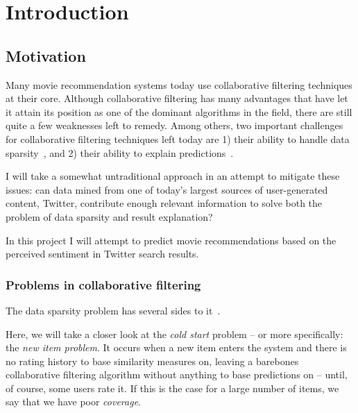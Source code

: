 
\chapter{Introduction} %

\label{Chapter1} %




\section{Motivation}

Many movie recommendation systems today use collaborative filtering techniques at their core. Although collaborative filtering has many advantages that have let it attain its position as one of the dominant algorithms in the field, there are still quite a few weaknesses left to remedy. Among others, two important challenges for collaborative filtering techniques left today are 1) their ability to handle data sparsity~\cite{Su:2009:SCF:1592474.1722966}, and 2) their ability to explain predictions~\cite{Herlocker:2000:ECF:358916.358995}.

I will take a somewhat untraditional approach in an attempt to mitigate these issues: can data mined from one of today's largest sources of user-generated content, Twitter, contribute enough relevant information to solve both the problem of data sparsity and result explanation?

In this project I will attempt to predict movie recommendations based on the perceived sentiment in Twitter search results.

\subsection{Problems in collaborative filtering}

The data sparsity problem has several sides to it~\cite{Su:2009:SCF:1592474.1722966}.

Here, we will take a closer look at the \emph{cold start} problem -- or more specifically: the \emph{new item problem}. It occurs when a new item enters the system and there is no rating history to base similarity measures on, leaving a barebones collaborative filtering algorithm without anything to base predictions on -- until, of course, some users rate it. If this is the case for a large number of items, we say that we have poor \emph{coverage}.

